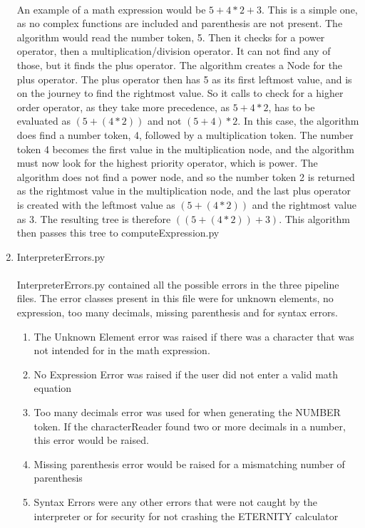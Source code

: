 \begin{enumerate}
            \paragraph{}
            An example of a math expression would be $5+4*2+3$. This is a simple one, as no complex functions are included and parenthesis are not present. The algorithm would read the number token, 5. Then it checks for a power operator, then a multiplication/division operator. It can not find any of those, but it finds the plus operator. The algorithm creates a Node for the plus operator. The plus operator then has 5 as its first leftmost value, and is on the journey to find the rightmost value. So it calls to check for a higher order operator, as they take more precedence, as $5 + 4*2$, has to be evaluated as $(5 + (4*2))$ and not $(5+4)*2$. In this case, the algorithm does find a number token, 4, followed by a multiplication token. The number token 4 becomes the first value in the multiplication node, and the algorithm must now look for the highest priority operator, which is power. The algorithm does not find a power node, and so the number token 2 is returned as the rightmost value in the multiplication node, and the last plus operator is created with the leftmost value as $(5+(4*2))$ and the rightmost value as 3. The resulting tree is therefore $((5+(4*2)) + 3)$. This algorithm then passes this tree to computeExpression.py

            \item InterpreterErrors.py
            \paragraph{}
            InterpreterErrors.py contained all the possible errors in the three pipeline files. The error classes present in this file were for unknown elements, no expression, too many decimals, missing parenthesis and for syntax errors.

            \begin{enumerate}
                \item The Unknown Element error was raised if there was a character that was not intended for in the math expression.
                \item No Expression Error was raised if the user did not enter a valid math equation
                \item Too many decimals error was used for when generating the NUMBER token. If the characterReader found two or more decimals in a number, this error would be raised.
                \item Missing parenthesis error would be raised for a mismatching number of parenthesis
                \item Syntax Errors were any other errors that were not caught by the interpreter or for security for not crashing the ETERNITY calculator
            \end{enumerate}


\end{enumerate}
